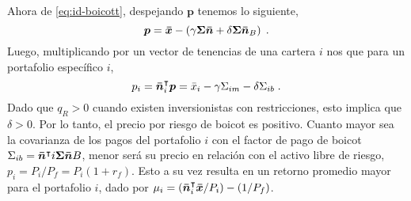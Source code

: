 \documentclass{article}
\begin{document}
Ahora de \eqref{eq:id-boicott}, despejando $\bm{p}$ tenemos lo siguiente,
\begin{equation*}
	\bm{p} = \bm{\Bar{x}} - \left(\gamma \bm{\Sigma}\bm{\Bar{n}} + \delta \bm{\Sigma}\bm{\Bar{n}}_{B}\right)\;.
\end{equation*}
Luego, multiplicando por un vector de tenencias de una cartera $i$ nos que para un portafolio específico $i$,
\begin{equation}
	p_{i} = \bm{\Bar{n}}^{\intercal}_{i}\bm{p} = \Bar{x}_{i}-\gamma\Sigma_{im}-\delta\Sigma_{ib}\;.
\end{equation}
Dado que $q_R>0$ cuando existen inversionistas con restricciones, esto implica que $\delta>0$. Por lo tanto, el precio por riesgo de boicot es positivo. Cuanto mayor sea la covarianza de los pagos del portafolio $i$ con el factor de pago de boicot $\Sigma_{ib}=\bm{\Bar{n}}^{\intercal}{i}\bm{\Sigma}\bm{\Bar{n}}{B}$, menor será su precio en relación con el activo libre de riesgo, $p_{i}=P_{i}/P_{f}=P_{i}(1+r_{f})$. Esto a su vez resulta en un retorno promedio mayor para el portafolio $i$, dado por $\mu_{i}=(\bm{\Bar{n}}^{\intercal}_{i}\bm{\Bar{x}}/P_i)-(1/P_f)$.
\end{document}
